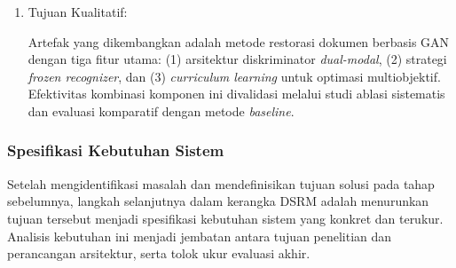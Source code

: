 \begin{enumerate}[label=\arabic*., leftmargin=*, labelindent=0pt, itemsep=1ex, topsep=0pt]
\item Tujuan Kualitatif:

Artefak yang dikembangkan adalah metode restorasi dokumen berbasis GAN dengan tiga fitur utama: (1) arsitektur diskriminator \textit{dual-modal}, (2) strategi \textit{frozen recognizer}, dan (3) \textit{curriculum learning} untuk optimasi multiobjektif. Efektivitas kombinasi komponen ini divalidasi melalui studi ablasi sistematis dan evaluasi komparatif dengan metode \textit{baseline}.
\end{enumerate}

\subsubsection{Spesifikasi Kebutuhan Sistem}
\label{subsubsec:requirements-analysis}

Setelah mengidentifikasi masalah dan mendefinisikan tujuan solusi pada tahap sebelumnya, langkah selanjutnya dalam kerangka DSRM adalah menurunkan tujuan tersebut menjadi spesifikasi kebutuhan sistem yang konkret dan terukur. Analisis kebutuhan ini menjadi jembatan antara tujuan penelitian dan perancangan arsitektur, serta tolok ukur evaluasi akhir.

